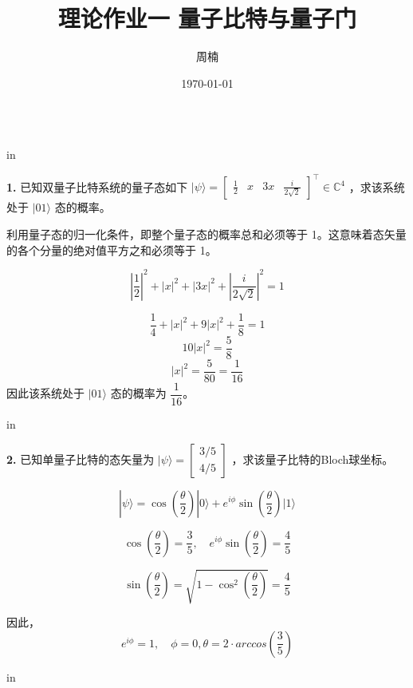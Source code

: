 \documentclass[11pt]{article}
\begin{document}
\title{{\bf 理论作业一 \quad 量子比特与量子门}}
\author{周楠 }
\date{\today}
\maketitle

\begin{tabular*}{13cm}{r}
\hline
\end{tabular*}

 in

{\bf 1.} 已知双量子比特系统的量子态如下 $|\psi\rangle = \begin{bmatrix} \frac{1}{2} & x & 3x & \frac{i}{2\sqrt{2}} \end{bmatrix} ^ \intercal \in \mathbb{C}^4$ ，求该系统处于 $|01\rangle$ 态的概率。

利用量子态的归一化条件，即整个量子态的概率总和必须等于 1。这意味着态矢量的各个分量的绝对值平方之和必须等于 1。

\[
\left|\frac{1}{2}\right|^2 + |x|^2 + |3x|^2 + \left|\frac{i}{2\sqrt{2}}\right|^2 = 1
\]

\[
\frac{1}{4} + |x|^2 + 9|x|^2 + \frac{1}{8} = 1
\]
\[
10|x|^2 = \frac{5}{8}
\]
\[
|x|^2 = \frac{5}{80} = \frac{1}{16}
\]
因此该系统处于 $|01\rangle$ 态的概率为 \(\dfrac{1}{16}\)。

 in

{\bf 2.} 已知单量子比特的态矢量为 $|\psi\rangle = \begin{bmatrix} 3/5 \\ 4/5 \end{bmatrix}$ ，求该量子比特的Bloch球坐标。

$$
|\psi \rangle = \cos(\frac{\theta}{2})|0\rangle + e^{i\phi}\sin(\frac{\theta}{2})|1\rangle 
$$

$$
\cos(\frac{\theta}{2}) = \frac{3}{5}, \quad e^{i\phi}\sin(\frac{\theta}{2}) = \frac{4}{5}
$$

$$
\sin(\frac{\theta}{2}) = \sqrt{1 - \cos^2(\frac{\theta}{2})} = \frac{4}{5}
$$

因此，
$$
e^{i\phi} = 1, \quad \phi = 0, \theta = 2 \cdot arccos(\frac{3}{5})
$$

 in
\end{document}
